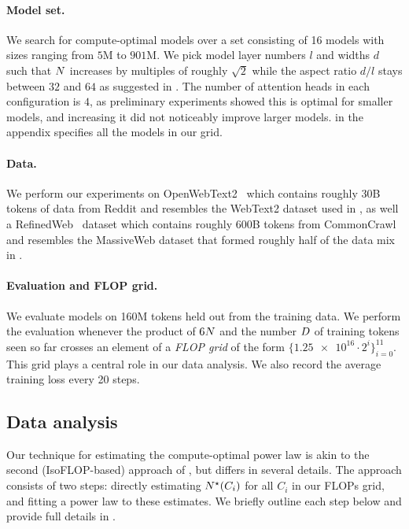 \documentclass{article}
\theoremstyle{plain}
\theoremstyle{definition}
\theoremstyle{remark}
\newcommand{\maybeSubscript}[1]{
  \ifthenelse{\equal{#1}{}}{}{_{#1}}%
}
\newcommand{\params}[1][]{N\maybeSubscript{#1}}
\newcommand{\paramsStar}[1][]{\params[#1]^{\star}}
\newcommand{\tokens}[1][]{D\maybeSubscript{#1}}
\begin{document}
\paragraph{Model set.} We search for compute-optimal models over a set consisting of 16 models with sizes ranging from $\num{5}$M to $\num{901}$M. We pick model layer numbers $l$ and widths $d$ such that $\params$ increases by multiples of roughly $\sqrt{2}$ while the aspect ratio $d/l$ stays between $\num{32}$ and $\num{64}$ as suggested in \citet{kaplan2020scaling}. The number of attention heads in each configuration is $\num{4}$, as preliminary experiments showed this is optimal for smaller models, and increasing it did not noticeably improve larger models.  in the appendix specifies all the models in our grid. 

\paragraph{Data.} We perform our experiments on OpenWebText2~\cite{gao2020pile} which contains roughly $30$B tokens of data from Reddit and resembles the WebText2 dataset used in \citet{kaplan2020scaling}, as well a RefinedWeb~\cite{penedo2023refinedweb} dataset which contains roughly $600$B tokens from CommonCrawl~\cite{commoncrawl} and resembles the MassiveWeb dataset that formed roughly half of the data mix in \citet{hoffmann2022empirical}. 

\paragraph{Evaluation and FLOP grid.}
We evaluate models on \num{160}M tokens held out from the training data. We perform the evaluation whenever the product of $6\params$ and the number $\tokens$ of training tokens seen so far crosses an element of a \emph{FLOP grid} of the form {$\{\num{1.25e16} \cdot 2^i\}_{i=0}^{11}$}. This grid plays a central role in our data analysis. We also record the average training loss every 20 steps.

\subsection{Data analysis}\label{subsec:data-analysis}

Our technique for estimating the compute-optimal power law is akin to the second (IsoFLOP-based) approach of \citet{hoffmann2022empirical}, but differs in several details. The approach consists of two steps: directly estimating $\paramsStar(C_i)$ for all $C_i$ in our FLOPs grid, and fitting a power law to these estimates. We briefly outline each step below and provide full details in .
\end{document}

